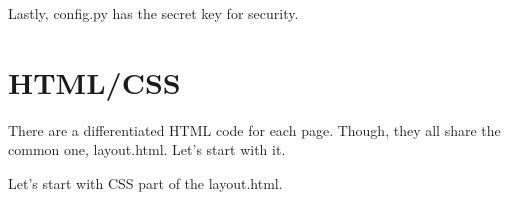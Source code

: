 \documentclass[letterpaper,10pt,english]{sphinxmanual}
\begin{document}
Lastly, config.py has the secret key for security.


\section{HTML/CSS}
\label{\detokenize{developer/index:html-css}}
There are a differentiated HTML code for each page. Though, they all share the common one,
layout.html. Let’s start with it.

Let’s start with CSS part of the layout.html.

\begin{sphinxVerbatim}[commandchars=\\\{\}]
  

             
       
\end{sphinxVerbatim}
\end{document}
